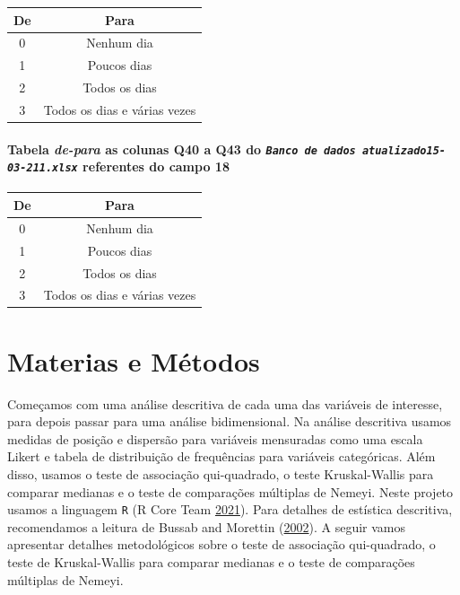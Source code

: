 \documentclass[]{article}
\let\oldparagraph\paragraph
\renewcommand{\paragraph}[1]{\oldparagraph{#1}\mbox{}}
\begin{document}
\begin{longtable}[]{@{}cc@{}}
\toprule
De & Para\tabularnewline
\midrule
\endhead
0 & Nenhum dia\tabularnewline
1 & Poucos dias\tabularnewline
2 & Todos os dias\tabularnewline
3 & Todos os dias e várias vezes\tabularnewline
\bottomrule
\end{longtable}

\hypertarget{tabela-de-para-as-colunas-q40-a-q43-do-banco-de-dados-atualizado15-03-211.xlsx-referentes-do-campo-18}{%
\paragraph{\texorpdfstring{Tabela \emph{de-para} as colunas Q40 a Q43 do \emph{\texttt{Banco\ de\ dados\ atualizado15-03-211.xlsx}} referentes do campo 18}{Tabela de-para as colunas Q40 a Q43 do Banco de dados atualizado15-03-211.xlsx referentes do campo 18}}\label{tabela-de-para-as-colunas-q40-a-q43-do-banco-de-dados-atualizado15-03-211.xlsx-referentes-do-campo-18}}

\begin{longtable}[]{@{}cc@{}}
\toprule
De & Para\tabularnewline
\midrule
\endhead
0 & Nenhum dia\tabularnewline
1 & Poucos dias\tabularnewline
2 & Todos os dias\tabularnewline
3 & Todos os dias e várias vezes\tabularnewline
\bottomrule
\end{longtable}

\hypertarget{materias-e-muxe9todos}{%
\section{Materias e Métodos}\label{materias-e-muxe9todos}}

Começamos com uma análise descritiva de cada uma das variáveis de interesse, para depois passar para uma análise bidimensional. Na análise descritiva usamos medidas de posição e dispersão para variáveis mensuradas como uma escala Likert e tabela de distribuição de frequências para variáveis categóricas. Além disso, usamos o teste de associação qui-quadrado, o teste Kruskal-Wallis para comparar medianas e o teste de comparações múltiplas de Nemeyi. Neste projeto usamos a linguagem \texttt{R} (R Core Team \protect\hyperlink{ref-Rlang}{2021}). Para detalhes de estística descritiva, recomendamos a leitura de Bussab and Morettin (\protect\hyperlink{ref-bussab2002estatistica}{2002}). A seguir vamos apresentar detalhes metodológicos sobre o teste de associação qui-quadrado, o teste de Kruskal-Wallis para comparar medianas e o teste de comparações múltiplas de Nemeyi.
\end{document}
